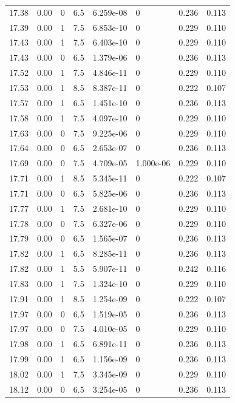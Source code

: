 \documentclass[preview]{standalone}
\begin{document}
{{{{{{{{{{{{{{{\begin{tabular}{L{1.2cm}C{1.2cm} C{0.3cm}C{0.5cm} C{1.4cm}C{1.4cm} C{1.4cm}C{1.4cm}}
  17.38  &  0.00  & 0     & 6.5 &  6.259e-08  & 0  & 0.236 &  0.113   \\ 
  17.39  &  0.00  & 1     & 7.5 &  6.853e-10  & 0  & 0.229 &  0.110   \\ 
  17.43  &  0.00  & 1     & 7.5 &  6.403e-10  & 0  & 0.229 &  0.110   \\ 
  17.43  &  0.00  & 0     & 6.5 &  1.379e-06  & 0  & 0.236 &  0.113   \\ 
  17.52  &  0.00  & 1     & 7.5 &  4.846e-11  & 0  & 0.229 &  0.110   \\ 
  17.53  &  0.00  & 1     & 8.5 &  8.387e-11  & 0  & 0.222 &  0.107   \\ 
  17.57  &  0.00  & 1     & 6.5 &  1.451e-10  & 0  & 0.236 &  0.113   \\ 
  17.58  &  0.00  & 1     & 7.5 &  4.097e-10  & 0  & 0.229 &  0.110   \\ 
  17.63  &  0.00  & 0     & 7.5 &  9.225e-06  & 0  & 0.229 &  0.110   \\ 
  17.64  &  0.00  & 0     & 6.5 &  2.653e-07  & 0  & 0.236 &  0.113   \\ 
  17.69  &  0.00  & 0     & 7.5 &  4.709e-05  & 1.000e-06  & 0.229 &  0.110   \\ 
  17.71  &  0.00  & 1     & 8.5 &  5.345e-11  & 0  & 0.222 &  0.107   \\ 
  17.71  &  0.00  & 0     & 6.5 &  5.825e-06  & 0  & 0.236 &  0.113   \\ 
  17.77  &  0.00  & 1     & 7.5 &  2.681e-10  & 0  & 0.229 &  0.110   \\ 
  17.78  &  0.00  & 0     & 7.5 &  6.327e-06  & 0  & 0.229 &  0.110   \\ 
  17.79  &  0.00  & 0     & 6.5 &  1.565e-07  & 0  & 0.236 &  0.113   \\ 
  17.82  &  0.00  & 1     & 6.5 &  8.285e-11  & 0  & 0.236 &  0.113   \\ 
  17.82  &  0.00  & 1     & 5.5 &  5.907e-11  & 0  & 0.242 &  0.116   \\ 
  17.83  &  0.00  & 1     & 7.5 &  1.324e-10  & 0  & 0.229 &  0.110   \\ 
  17.91  &  0.00  & 1     & 8.5 &  1.254e-09  & 0  & 0.222 &  0.107   \\ 
  17.97  &  0.00  & 0     & 6.5 &  1.519e-05  & 0  & 0.236 &  0.113   \\ 
  17.97  &  0.00  & 0     & 7.5 &  4.010e-05  & 0  & 0.229 &  0.110   \\ 
  17.98  &  0.00  & 1     & 6.5 &  6.891e-11  & 0  & 0.236 &  0.113   \\ 
  17.99  &  0.00  & 1     & 6.5 &  1.156e-09  & 0  & 0.236 &  0.113   \\ 
  18.02  &  0.00  & 1     & 7.5 &  3.345e-09  & 0  & 0.229 &  0.110   \\ 
  18.12  &  0.00  & 0     & 6.5 &  3.254e-05  & 0  & 0.236 &  0.113   \\ 
\hline 
\end{tabular} 

}}}}}}}}}}}}}}}
\end{document}
